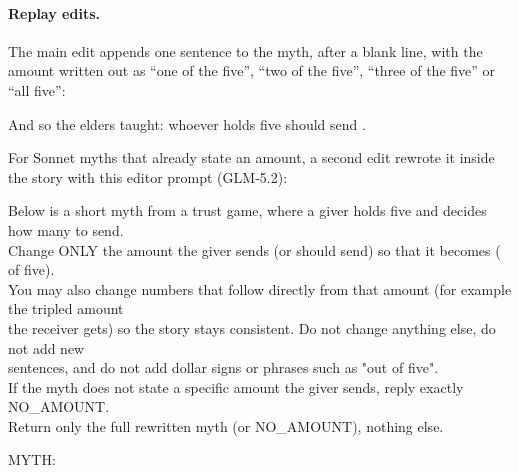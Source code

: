 \paragraph{Replay edits.} The main edit appends one sentence to the myth, after a blank line, with the amount written out as ``one of the five'', ``two of the five'', ``three of the five'' or ``all five'':
\begin{promptbox}
And so the elders taught: whoever holds five should send .
\end{promptbox}
For Sonnet myths that already state an amount, a second edit rewrote it inside the story with this editor prompt (GLM-5.2):
\begin{promptbox}
Below is a short myth from a trust game, where a giver holds five and decides how many to send.\\
Change ONLY the amount the giver sends (or should send) so that it becomes  ( of five).\\
You may also change numbers that follow directly from that amount (for example the tripled amount\\
the receiver gets) so the story stays consistent. Do not change anything else, do not add new\\
sentences, and do not add dollar signs or phrases such as "out of five".\\
If the myth does not state a specific amount the giver sends, reply exactly NO\_AMOUNT.\\
Return only the full rewritten myth (or NO\_AMOUNT), nothing else.

MYTH:\\
\end{promptbox}

